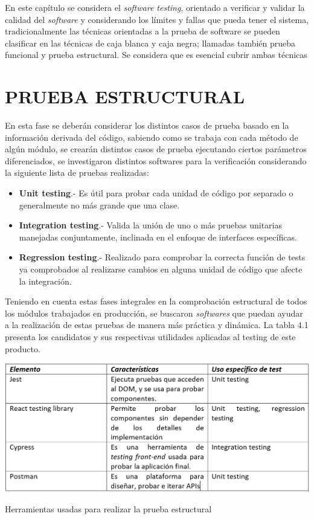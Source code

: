 \documentclass[letter, openright, 12pt]{book}
\begin{document}
{En este capítulo se considera el \textit{software testing}, orientado a verificar y validar la calidad del \textit{software} y considerando los límites y fallas que pueda tener el sistema, tradicionalmente las técnicas orientadas a la prueba de software se pueden clasificar en las técnicas de caja blanca y caja negra; llamadas también prueba funcional y prueba estructural. Se considera que es esencial cubrir ambas técnicas 

\section{PRUEBA ESTRUCTURAL}
En esta fase se deberán considerar los distintos casos de prueba basado en la información derivada del código, sabiendo como se trabaja con cada método de algún módulo, se crearán distintos casos de prueba ejecutando ciertos parámetros diferenciados, se investigaron distintos softwares para la verificación considerando la siguiente lista de pruebas realizadas:
\begin{itemize}
\item \textbf{Unit testing}.- Es útil para probar cada unidad de código por separado o generalmente no más grande que una clase. 
\item \textbf{Integration testing}.- Valida la unión de uno o más pruebas unitarias manejadas conjuntamente, inclinada en el enfoque de interfaces específicas. 
\item \textbf{Regression testing}.-  Realizado para comprobar la correcta función de tests ya comprobados al realizarse cambios en alguna unidad de código que afecte la integración.
\end{itemize}

Teniendo en cuenta estas fases integrales en la comprobación estructural de todos los módulos trabajados en producción, se buscaron \textit{softwares} que puedan ayudar a la realización de estas pruebas de manera más práctica y dinámica. La tabla 4.1 presenta los candidatos y sus respectivas utilidades aplicadas al testing de este producto. 

\begin{table}[H]
\includegraphics[width=1\textwidth]{tabla4_1}
\caption{Herramientas usadas para realizar la prueba estructural } 
\label{tab:tabla4_1} 
\end{table}

}
\end{document}
